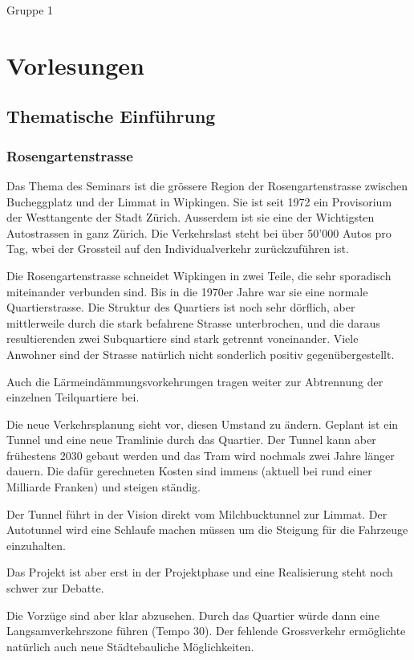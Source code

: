 \documentclass[a4paper,11pt,ngerman]{scrartcl}
\begin{document}
Gruppe 1

\section{Vorlesungen}
\label{sec-2}

\subsection{Thematische Einführung}
\label{sec-2-1}

\subsubsection{Rosengartenstrasse}
\label{sec-2-1-1}

Das Thema des Seminars ist die grössere Region der Rosengartenstrasse
zwischen Bucheggplatz und der Limmat in Wipkingen. Sie ist seit 1972 ein
Provisorium der Westtangente der Stadt Zürich. Ausserdem ist sie eine der
Wichtigsten Autostrassen in ganz Zürich. Die Verkehrslast steht bei über
50'000 Autos pro Tag, wbei der Grossteil auf den Individualverkehr
zurückzuführen ist.

Die Rosengartenstrasse schneidet Wipkingen in zwei Teile, die sehr
sporadisch miteinander verbunden sind. Bis in die 1970er Jahre war sie eine
normale Quartierstrasse. Die Struktur des Quartiers ist noch sehr dörflich,
aber mittlerweile durch die stark befahrene Strasse unterbrochen, und die
daraus resultierenden zwei Subquartiere sind stark getrennt
voneinander. Viele Anwohner sind der Strasse natürlich nicht sonderlich
positiv gegenübergestellt.

Auch die Lärmeindämmungsvorkehrungen tragen weiter zur Abtrennung der
einzelnen Teilquartiere bei.

Die neue Verkehrsplanung sieht vor, diesen Umstand zu ändern. Geplant ist
ein Tunnel und eine neue Tramlinie durch das Quartier. Der Tunnel kann aber
frühestens 2030 gebaut werden und das Tram wird nochmals zwei Jahre länger
dauern. Die dafür gerechneten Kosten sind immens (aktuell bei rund einer
Milliarde Franken) und steigen ständig.

Der Tunnel führt in der Vision direkt vom Milchbucktunnel zur Limmat. Der
Autotunnel wird eine Schlaufe machen müssen um die Steigung für die
Fahrzeuge einzuhalten.

Das Projekt ist aber erst in der Projektphase und eine Realisierung steht
noch schwer zur Debatte.

Die Vorzüge sind aber klar abzusehen. Durch das Quartier würde dann eine
Langsamverkehrszone führen (Tempo 30). Der fehlende Grossverkehr
ermöglichte natürlich auch neue Städtebauliche Möglichkeiten.
\end{document}
